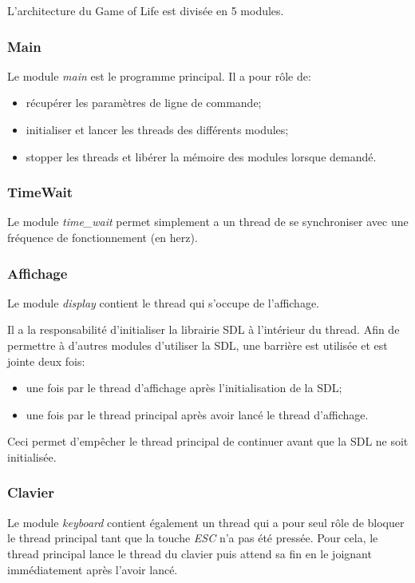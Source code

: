\documentclass[11pt, a4paper]{article}
\begin{document}
L'architecture du Game of Life est divisée en 5 modules. \\

\subsubsection{Main}
Le module \textit{main} est le programme principal.
Il a pour rôle de:

\begin{itemize}
    \item récupérer les paramètres de ligne de commande;
    \item initialiser et lancer les threads des différents modules;
    \item stopper les threads et libérer la mémoire des modules lorsque demandé. \\
\end{itemize}

\subsubsection{TimeWait}
Le module \textit{time\_wait} permet simplement a un thread
de se synchroniser avec une fréquence de fonctionnement (en herz). \\

\subsubsection{Affichage}
Le module \textit{display} contient le thread qui s'occupe de l'affichage.

Il a la responsabilité d'initialiser la librairie SDL à l'intérieur du thread.
Afin de permettre à d'autres modules d'utiliser la SDL, une barrière est utilisée et est jointe deux fois:

\begin{itemize}
    \item une fois par le thread d'affichage après l'initialisation de la SDL;
    \item une fois par le thread principal après avoir lancé le thread d'affichage.
\end{itemize}

Ceci permet d'empêcher le thread principal de continuer avant que la SDL ne soit initialisée. \\

\subsubsection{Clavier}
Le module \textit{keyboard} contient également un thread qui a pour seul rôle de bloquer le thread principal
tant que la touche \textit{ESC} n'a pas été pressée.
Pour cela, le thread principal lance le thread du clavier puis attend sa fin en le joignant immédiatement après l'avoir lancé. \\
\end{document}

